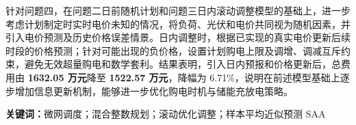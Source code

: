 针对问题四，在问题二日前随机计划和问题三日内滚动调整模型的基础上，进一步考虑计划制定时实时电价未知的情况，将负荷、光伏和电价共同视为随机因素，并引入电价预测及历史价格误差情景。日内调整时，根据已实现的真实电价更新后续时段的价格预测；针对可能出现的负价格，设置计划购电上限及调增、调减互斥约束，避免无效超量购电和数学套利。结果表明，引入日内预报和价格更新后，总费用由 \textbf{1632.05 万元}降至 \textbf{1522.57 万元}，降幅为 6.71\%，说明在前述模型基础上逐步增加信息更新机制，能够进一步优化购电时机与储能充放电策略。

\par\vspace{0.8\baselineskip}
\noindent\textbf{关键词：}微网调度；混合整数规划；滚动优化调整；样本平均近似预测 SAA
\endgroup

\newpage
